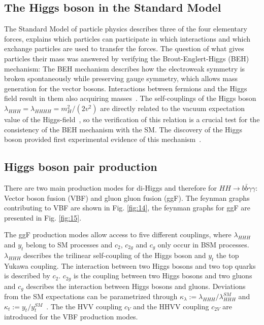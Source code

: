 \label{sec:theory}

\subsection{The Higgs boson in the Standard Model}

The Standard Model of particle physics describes three of the four elementary forces, explains which particles can participate in which interactions and which exchange particles are
used to transfer the forces. The question of what gives particles their mass was answered by verifying the Brout-Englert-Higgs (BEH) mechanism: The BEH mechanism describes how the electroweak symmetry
is broken spontaneously while preserving gauge symmetry, which allows mass generation for the vector bosons. Interactions between fermions and the Higgs field result in them also acquiring masses~\cite{Guerrero:2021}. The self-couplings of the Higgs boson $\lambda_{HHH} = \lambda_{HHHH} = m_H^2/(2v^2)$ are directly related
to the vacuum expectation value of the Higgs-field~\cite{HandbookLHC}, so the verification of this relation is a crucial test for the consistency of the BEH mechanism with the SM. 
The discovery of the Higgs boson provided first experimental evidence of this mechanism~\cite{Guerrero:2021}.\\

\subsection{Higgs boson pair production}
\label{sec:sig_processes}

There are two main production modes for di-Higgs and therefore for $HH \rightarrow b \bar{b} \gamma \gamma$: Vector boson fusion (VBF) and gluon gluon fusion (ggF). 
The feynman graphs contributing to VBF are shown in Fig. \ref{fig:14}, the feynman graphs for ggF are presented in Fig. \ref{fig:15}. \\


The ggF production modes allow access to five different couplings, where $\lambda_{HHH}$ and $y_t$ belong to SM processes and $c_2$, $c_{2g}$ and $c_{g}$ only occur in BSM processes.
$\lambda_{HHH}$ describes the trilinear self-coupling of the Higgs boson and $y_t$ the top Yukawa coupling. The interaction between two Higgs bosons and two top quarks is described by $c_2$.
$c_{2g}$ is the coupling between two Higgs bosons and two gluons and $c_{g}$ describes the interaction between Higgs bosons and gluons.
Deviations from the SM expectations
can be parametrized through $\kappa_{\lambda} := \lambda_{HHH}/\lambda_{HHH}^{SM}$ and $\kappa_{t} := y_{t}/y_{t}^{SM}$~\cite{CMS:2021qbp}.
The the HVV coupling $c_V$ and the HHVV coupling $c_{2V}$ are introduced for the VBF production modes.


